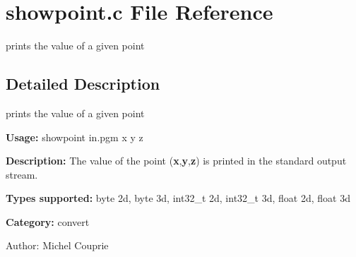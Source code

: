 \section{showpoint.c File Reference}
\label{showpoint_8c}
prints the value of a given point  




\label{_details}
\subsection{Detailed Description}
prints the value of a given point 

{\bf Usage:} showpoint in.pgm x y z

{\bf Description:} The value of the point ({\bf x},{\bf y},{\bf z}) is printed in the standard output stream.

{\bf Types supported:} byte 2d, byte 3d, int32\_\-t 2d, int32\_\-t 3d, float 2d, float 3d

{\bf Category:} convert

\begin{Desc}
\item[Author:]Michel Couprie \end{Desc}
